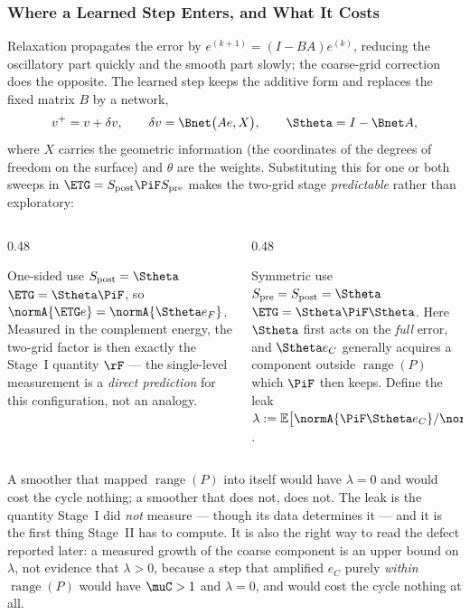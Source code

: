 \frametitle{Where a Learned Step Enters, and What It Costs}
\footnotesize

Relaxation propagates the error by $e^{(k+1)}=(I-BA)e^{(k)}$, reducing the oscillatory
part quickly and the smooth part slowly; the coarse-grid correction does the opposite. The
learned step keeps the additive form and replaces the fixed matrix $B$ by a network,
\[
v^{+}=v+\delta v,\qquad \delta v=\Bnet\bigl(Ae,X\bigr),\qquad \Stheta=I-\Bnet A ,
\]
where $X$ carries the geometric information (the coordinates of the degrees of freedom on
the surface) and $\theta$ are the weights. Substituting this for one or both sweeps in
$\ETG=S_{\mathrm{post}}\PiF S_{\mathrm{pre}}$ makes the two-grid stage
\emph{predictable} rather than exploratory:

\begin{columns}[T]
\begin{column}{0.48\textwidth}
\begin{block}{One-sided use $S_{\mathrm{post}}=\Stheta$}
$\ETG=\Stheta\PiF$, so $\normA{\ETG e}=\normA{\Stheta e_F}$. Measured in the complement
energy, the two-grid factor is then \alert{exactly} the Stage~I quantity $\rF$ --- the
single-level measurement is a \emph{direct prediction} for this configuration, not an
analogy.
\end{block}
\end{column}
\begin{column}{0.48\textwidth}
\begin{block}{Symmetric use $S_{\mathrm{pre}}=S_{\mathrm{post}}=\Stheta$}
$\ETG=\Stheta\PiF\Stheta$. Here $\Stheta$ first acts on the \emph{full} error, and
$\Stheta e_C$ generally acquires a component outside $\operatorname{range}(P)$ which
$\PiF$ then keeps. Define the \alert{leak}
$\lambda:=\mathbb{E}\bigl[\normA{\PiF\Stheta e_C}/\normA{e_C}\bigr]$.
\end{block}
\end{column}
\end{columns}

\vspace{1mm}
A smoother that mapped $\operatorname{range}(P)$ into itself would have $\lambda=0$ and
would cost the cycle nothing; a smoother that does not, does not. The leak is the quantity
Stage~I did \emph{not} measure --- though its data determines it --- and it is the first
thing Stage~II has to compute. It is also the right way to read the defect reported later:
a measured growth of the coarse component is an \alert{upper bound} on $\lambda$, not
evidence that $\lambda>0$, because a step that amplified $e_C$ purely \emph{within}
$\operatorname{range}(P)$ would have $\muC>1$ and $\lambda=0$, and would cost the cycle
nothing at all.
